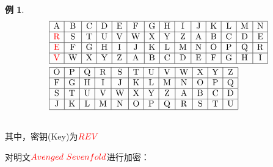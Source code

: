 \documentclass{article}
\theoremstyle{definition}
\newtheorem{example}{\indent 例}
\begin{document}
\begin{example}

$$
\begin{aligned}
&\begin{array}{|c|c|c|c|c|c|c|c|c|c|c|c|c|c|}
\hline \mathrm{A} & \mathrm{B} & \mathrm{C} & \mathrm{D} & \mathrm{E} & \mathrm{F} & \mathrm{G} & \mathrm{H} & \mathrm{I} & \mathrm{J} & \mathrm{K} & \mathrm{L} & \mathrm{M} & \mathrm{N} \\
\hline \mathrm{\color{red}R} & \mathrm{S} & \mathrm{T} & \mathrm{U} & \mathrm{V} & \mathrm{W} & \mathrm{X} & \mathrm{Y} & \mathrm{Z} & \mathrm{A} & \mathrm{B} & \mathrm{C} & \mathrm{D} & \mathrm{E} \\
\hline \mathrm{\color{red}E} & \mathrm{F} & \mathrm{G} & \mathrm{H} & \mathrm{I} & \mathrm{J} & \mathrm{K} & \mathrm{L} & \mathrm{M} & \mathrm{N} & \mathrm{O} & \mathrm{P} & \mathrm{Q} & \mathrm{R} \\
\hline \mathrm{\color{red}V} & \mathrm{W} & \mathrm{X} & \mathrm{Y} & \mathrm{Z} & \mathrm{A} & \mathrm{B} & \mathrm{C} & \mathrm{D} & \mathrm{E} & \mathrm{F} & \mathrm{G} & \mathrm{H} & \mathrm{I} \\
\hline
\end{array}\\
&\begin{array}{|c|c|c|c|c|c|c|c|c|c|c|c|}
\hline \mathrm{O} & \mathrm{P} & \mathrm{Q} & \mathrm{R} & \mathrm{S} & \mathrm{T} & \mathrm{U} & \mathrm{V} & \mathrm{W} & \mathrm{X} & \mathrm{Y} & \mathrm{Z} \\
\hline \mathrm{F} & \mathrm{G} & \mathrm{H} & \mathrm{I} & \mathrm{J} & \mathrm{K} & \mathrm{L} & \mathrm{M} & \mathrm{N} & \mathrm{O} & \mathrm{P} & \mathrm{Q} \\
\hline \mathrm{S} & \mathrm{T} & \mathrm{U} & \mathrm{V} & \mathrm{W} & \mathrm{X} & \mathrm{Y} & \mathrm{Z} & \mathrm{A} & \mathrm{B} & \mathrm{C} & \mathrm{D} \\
\hline \mathrm{J} & \mathrm{K} & \mathrm{L} & \mathrm{M} & \mathrm{N} & \mathrm{O} & \mathrm{P} & \mathrm{Q} & \mathrm{R} & \mathrm{S} & \mathrm{T} & \mathrm{U} \\
\hline
\end{array}
\end{aligned}
$$

~\\

其中，密钥(Key)为${\color{red}REV}$


对明文${\color{red}Avenged\ Sevenfold}$进行加密：


\end{example}
\end{document}
